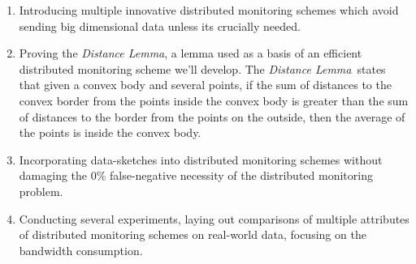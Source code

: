 \documentclass[11pt, conference]{article}
\newcommand{\distanceLemma}{\textit{Distance Lemma}}
\begin{document}
\begin{enumerate}
\item Introducing multiple innovative distributed monitoring schemes which avoid sending big dimensional data unless its crucially needed.

\item Proving the \distanceLemma , a lemma used as a basis of an efficient distributed monitoring scheme we'll develop. The \distanceLemma \ states that given a convex body and several points, if the sum of distances to the convex border from the points inside the convex body is greater than the sum of distances to the border from the points on the outside, then the average of the points is inside the convex body.

\item Incorporating data-sketches into distributed monitoring schemes without damaging the 0\% false-negative necessity of the distributed monitoring problem.

\item Conducting several experiments, laying out comparisons of multiple attributes of distributed monitoring schemes on real-world data, focusing on the bandwidth consumption.
\end{enumerate}



	
\end{document}
